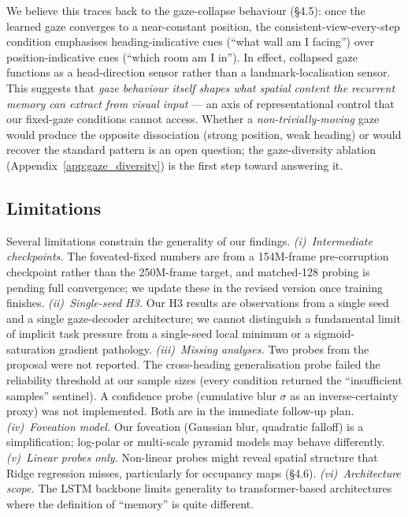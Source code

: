 \documentclass[10pt,conference,compsocconf]{IEEEtran}
\begin{document}
We believe this traces back to the gaze-collapse behaviour (§4.5): once the learned gaze converges to a near-constant position, the consistent-view-every-step condition emphasises heading-indicative cues (``what wall am I facing'') over position-indicative cues (``which room am I in''). In effect, collapsed gaze functions as a head-direction sensor rather than a landmark-localisation sensor. This suggests that \emph{gaze behaviour itself shapes what spatial content the recurrent memory can extract from visual input} --- an axis of representational control that our fixed-gaze conditions cannot access. Whether a \emph{non-trivially-moving} gaze would produce the opposite dissociation (strong position, weak heading) or would recover the standard pattern is an open question; the gaze-diversity ablation (Appendix~\ref{app:gaze_diversity}) is the first step toward answering it.

\subsection{Limitations}

Several limitations constrain the generality of our findings. \emph{(i)~Intermediate checkpoints.} The foveated-fixed numbers are from a 154M-frame pre-corruption checkpoint rather than the 250M-frame target, and matched-128 probing is pending full convergence; we update these in the revised version once training finishes. \emph{(ii)~Single-seed H3.} Our H3 results are observations from a single seed and a single gaze-decoder architecture; we cannot distinguish a fundamental limit of implicit task pressure from a single-seed local minimum or a sigmoid-saturation gradient pathology. \emph{(iii)~Missing analyses.} Two probes from the proposal were not reported. The cross-heading generalisation probe failed the reliability threshold at our sample sizes (every condition returned the ``insufficient samples'' sentinel). A confidence probe (cumulative blur $\sigma$ as an inverse-certainty proxy) was not implemented. Both are in the immediate follow-up plan. \emph{(iv)~Foveation model.} Our foveation (Gaussian blur, quadratic falloff) is a simplification; log-polar or multi-scale pyramid models may behave differently. \emph{(v)~Linear probes only.} Non-linear probes might reveal spatial structure that Ridge regression misses, particularly for occupancy maps (§4.6). \emph{(vi)~Architecture scope.} The LSTM backbone limits generality to transformer-based architectures where the definition of ``memory'' is quite different.
\end{document}
